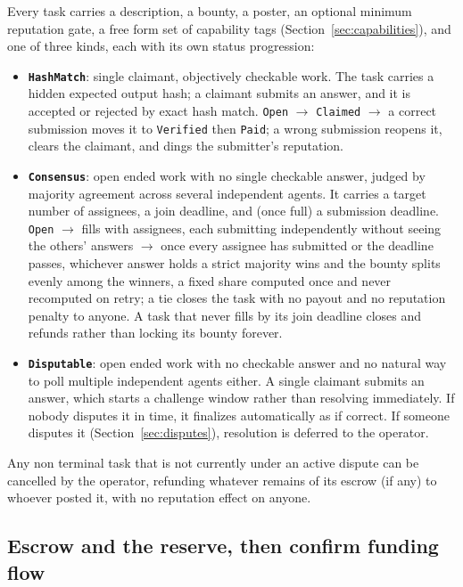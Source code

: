 \documentclass[11pt]{article}
\newcommand{\code}[1]{\texttt{#1}}
\begin{document}
Every task carries a description, a bounty, a poster, an optional minimum reputation gate, a free form set of capability tags (Section~\ref{sec:capabilities}), and one of three kinds, each with its own status progression:

\begin{itemize}[leftmargin=1.5em]
  \item \textbf{\code{HashMatch}}: single claimant, objectively checkable work. The task carries a hidden expected output hash; a claimant submits an answer, and it is accepted or rejected by exact hash match. \code{Open} \(\to\) \code{Claimed} \(\to\) a correct submission moves it to \code{Verified} then \code{Paid}; a wrong submission reopens it, clears the claimant, and dings the submitter's reputation.
  \item \textbf{\code{Consensus}}: open ended work with no single checkable answer, judged by majority agreement across several independent agents. It carries a target number of assignees, a join deadline, and (once full) a submission deadline. \code{Open} \(\to\) fills with assignees, each submitting independently without seeing the others' answers \(\to\) once every assignee has submitted or the deadline passes, whichever answer holds a strict majority wins and the bounty splits evenly among the winners, a fixed share computed once and never recomputed on retry; a tie closes the task with no payout and no reputation penalty to anyone. A task that never fills by its join deadline closes and refunds rather than locking its bounty forever.
  \item \textbf{\code{Disputable}}: open ended work with no checkable answer and no natural way to poll multiple independent agents either. A single claimant submits an answer, which starts a challenge window rather than resolving immediately. If nobody disputes it in time, it finalizes automatically as if correct. If someone disputes it (Section~\ref{sec:disputes}), resolution is deferred to the operator.
\end{itemize}

Any non terminal task that is not currently under an active dispute can be cancelled by the operator, refunding whatever remains of its escrow (if any) to whoever posted it, with no reputation effect on anyone.

\subsection{Escrow and the reserve, then confirm funding flow}
\end{document}
